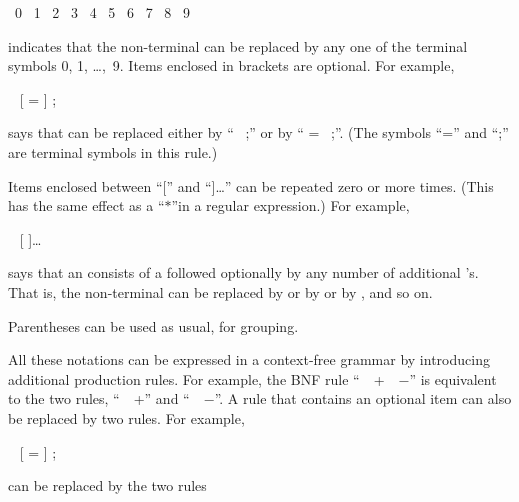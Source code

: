\smallskip   
\centerline{ \BNFPRODUCES\ 0 \BNFALT\ 1 \BNFALT\ 2
          \BNFALT\ 3 \BNFALT\ 4 \BNFALT\ 5 \BNFALT\ 6 \BNFALT\ 7
          \BNFALT\ 8 \BNFALT\ 9}
          
\smallskip

\IItem{}indicates that the non-terminal  can be replaced
by any one of the terminal symbols 0, 1, \dots,~9.
\smallskip
\IItem{$\bullet\,\,$}Items enclosed in brackets are optional.  For example,

\smallskip
\centerline{ \BNFPRODUCES\  
                 [ =  ] ;}

\smallskip
\IItem{}says that  can be replaced either
by `` ~;'' or by `` 
= ~;''.
(The symbols ``='' and ``;'' are terminal symbols in this rule.)

\smallskip
\IItem{$\bullet\,\,$}Items enclosed between ``['' and ``]\dots''
can be repeated zero or more times.  (This has the same effect
as a ``$*$''in a regular expression.)  For example,

\centerline{ \BNFPRODUCES\  [  ]\dots}
\smallskip

\IItem{}says that an  consists of a  followed
optionally by any number of additional 's.  That is,
the non-terminal  can be replaced by  or
by  or by , and
so on.

\smallskip
\IItem{$\bullet\,\,$}Parentheses can be used as usual, for grouping. 
\smallskip

All these notations can be expressed in a context-free grammar
by introducing additional production rules.  For example, the
BNF rule ``~\BNFPRODUCES\ +~\BNFALT~$-$'' is equivalent
to the two rules, ``~\BNFPRODUCES~+''
and ``~\BNFPRODUCES~$-$''.  A rule that contains an
optional item can also be replaced by two rules.  For example,

\smallskip
\centerline{ \BNFPRODUCES\  
                 [ =  ] ;}

\smallskip
\noindent can be replaced by the two rules

\smallskip
\centerline{\vbox{}}
                  
